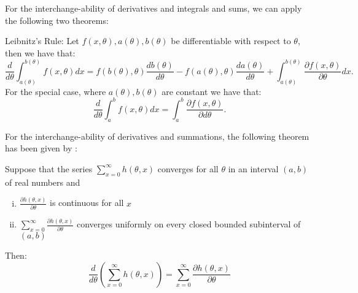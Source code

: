 For the interchange-ability of derivatives and integrals and sums, we can apply the following two theorems:

\begin{theorem}
    Leibnitz's Rule:
    Let \(f(x, \theta), a(\theta), b(\theta)\) be differentiable with respect to \(\theta\), then we have that:
    \[ \frac{d}{d\theta} \int_{a(\theta)}^{b(\theta)} f(x, \theta) dx = f(b(\theta), \theta) \frac{d b(\theta)}{d\theta} - f(a(\theta), \theta) \frac{d a(\theta)}{d\theta} + \int_{a(\theta)}^{b(\theta)} \frac{\partial f(x, \theta) }{\partial \theta} dx.\] For the special case, where \(a(\theta), b(\theta)\) are constant we have that: 
    \[\frac{d}{d\theta} \int_{a}^{b} f(x, \theta) dx =  \int_{a}^{b} \frac{ \partial f(x, \theta)}{ \partial d\theta}.\]
\end{theorem}

For the interchange-ability of derivatives and summations, the following theorem has been given by \cite{casella2002}:
\begin{theorem}
    Suppose that the series \(\sum_{x = 0}^{\infty} h(\theta, x)\) converges for all \(\theta\) in an interval \((a, b)\) of real numbers and 
    
    \begin{enumerate}[(i)]
        \item \(\frac{\partial h(\theta, x)}{\partial \theta}\) is continuous for all \(x\)
        \item \(\sum_{x = 0}^{\infty} \frac{\partial h(\theta, x)}{\partial \theta}\) converges uniformly on every closed bounded subinterval of \((a, b)\)
    \end{enumerate}
    Then:
    \[
    \frac{d}{d \theta} \left( \sum_{x = 0}^{\infty} h(\theta, x) \right) = \sum_{x = 0}^{\infty} \frac{\partial h(\theta, x)}{\partial \theta}
    \]
    
   
\end{theorem}
\newpage
